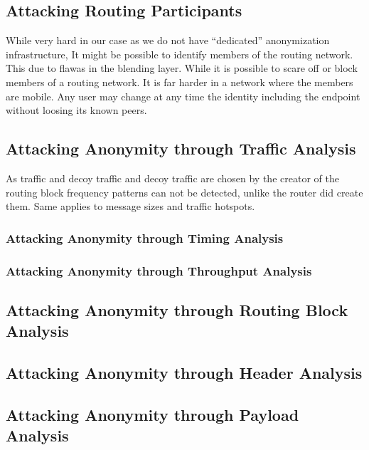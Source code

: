 \subsection{Attacking Routing Participants}
While very hard in our case as we do not have ``dedicated'' anonymization infrastructure, It might be possible to identify members of the routing network. This due to flawas in the blending layer. While it is possible to scare off or block members of a routing network. It is far harder in a network where the members are mobile. Any user may change at any time the identity including the endpoint without loosing its known peers.

\subsection{Attacking Anonymity through Traffic Analysis}
As traffic and decoy traffic and decoy traffic are chosen by the creator of the routing block frequency patterns can not be detected, unlike the router did create them. Same applies to message sizes and traffic hotspots. 

\subsubsection{Attacking Anonymity through Timing Analysis}

\subsubsection{Attacking Anonymity through Throughput Analysis}

\subsection{Attacking Anonymity through Routing Block Analysis}

\subsection{Attacking Anonymity through Header Analysis}

\subsection{Attacking Anonymity through Payload Analysis}

